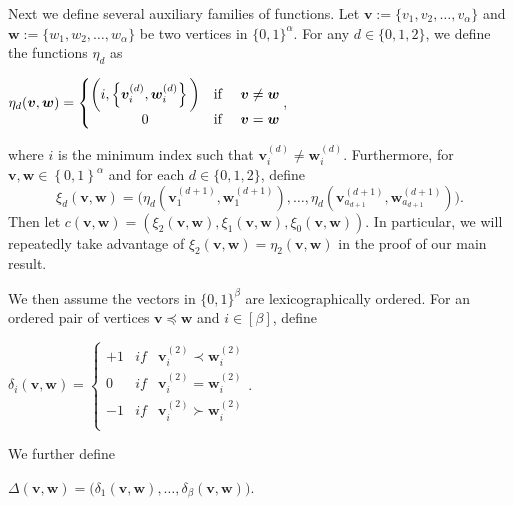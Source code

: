 \documentclass[11pt]{article}
\theoremstyle{definition}
\begin{document}
Next we define several auxiliary families of functions. Let $\boldsymbol{v}:=\{v_{1},v_{2},\ldots,v_{\alpha}\}$ and $\boldsymbol{w}:=\{w_{1},w_{2},\ldots,w_{\alpha}\}$ be two vertices in $\{0,1\}^{\alpha}$. For any $d\in\{0,1,2\}$, we define the functions $\eta_{d}$ as
\begin{center}
    $\eta_{d}(\boldsymbol{v},\boldsymbol{w})=\left\{\begin{matrix}
 \bigg(i,\left\{\boldsymbol{v}_{i}^{(d)},\boldsymbol{w}_i^{(d)} \right\}\bigg)&\textup{if } &\boldsymbol{v}\neq\boldsymbol{w} \\
 0 & \textup{if } &\boldsymbol{v}=\boldsymbol{w} \\
\end{matrix}\right.$,
\end{center}
where $i$ is the minimum index such that $\boldsymbol{v}_i^{(d)}\neq \boldsymbol{w}_i^{(d)}$. Furthermore, for $\boldsymbol{v},\boldsymbol{w}\in \left\{0,1 \right\}^\alpha$ and for each $d\in\{0,1,2\}$, define
\begin{equation*}
    \xi_{d}(\boldsymbol{v},\boldsymbol{w})=\bigg(\eta_{d}(\boldsymbol{v}_{1}^{(d+1)},\boldsymbol{w}_{1}^{(d+1)}),\ldots,\eta_{d}(\boldsymbol{v}_{a_{d+1}}^{(d+1)},\boldsymbol{w}_{a_{d+1}}^{(d+1)})\bigg).
\end{equation*}
Then let $c(\boldsymbol{v},\boldsymbol{w})=(\xi_{2}(\boldsymbol{v},\boldsymbol{w}),\xi_{1}(\boldsymbol{v},\boldsymbol{w}),\xi_{0}(\boldsymbol{v},\boldsymbol{w}))$. In particular, we will repeatedly take advantage of $\xi_{2}(\boldsymbol{v},\boldsymbol{w})=\eta_{2}(\boldsymbol{v},\boldsymbol{w})$ in the proof of our main result.

We then assume the vectors in $\{0,1\}^{\beta}$ are lexicographically ordered. For an ordered pair of vertices $\boldsymbol{v}\preceq \boldsymbol{w}$ and $i\in[\beta]$, define
\begin{center}
    $\delta_{i}(\boldsymbol{v},\boldsymbol{w})=\left\{\begin{matrix}
 +1&if &\boldsymbol{v}_{i}^{(2)}\prec \boldsymbol{w}_{i}^{(2)} \\
 0&if&\boldsymbol{v}_{i}^{(2)} = \boldsymbol{w}_{i}^{(2)} \\
 -1& if &\boldsymbol{v}_{i}^{(2)}\succ\boldsymbol{w}_{i}^{(2)} \\
\end{matrix}\right.$.
\end{center}

We further define
\begin{center}
    $\Delta(\boldsymbol{v},\boldsymbol{w})=\big(\delta_{1}(\boldsymbol{v},\boldsymbol{w}),\ldots,\delta_{\beta}(\boldsymbol{v},\boldsymbol{w})\big)$.
\end{center}
\end{document}
